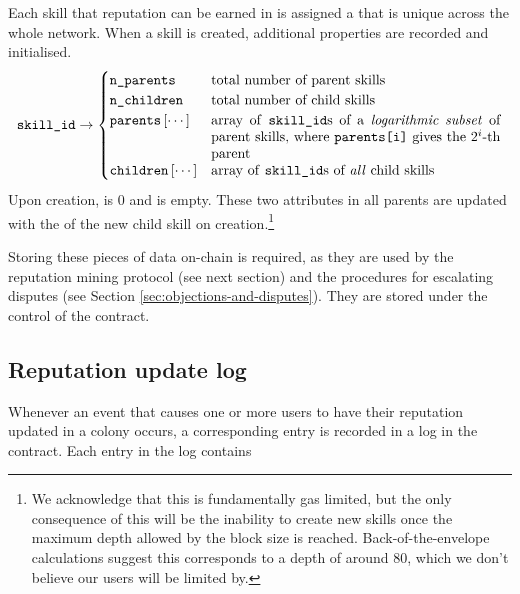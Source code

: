 Each skill that reputation can be earned in is assigned a  that is unique across the whole network. When a skill is created, additional properties are recorded and initialised.
\begin{equation*}
  \ascode{skill\_id} \rightarrow
  \begin{cases}
    \ascode{n\_parents} &	\textnormal{total number of parent skills}\\
    \ascode{n\_children} &	\textnormal{total number of child skills}\\
    \ascode{parents}\left[\cdots\right] &	\parbox[t]{.6\linewidth}{\textnormal{array of \ascode{skill\_id}s of a \textit{logarithmic subset} of parent skills, where \ascode{parents[i]} gives the $2^i$-th parent}}\\
    \ascode{children}\left[\cdots\right] &	\textnormal{array of \ascode{skill\_id}s of \textit{all} child skills}
  \end{cases}
\end{equation*}
Upon creation,  is 0 and  is empty\watermark. These two attributes in all parents are updated with the  of the new child skill on creation.\footnote{We acknowledge that this is fundamentally gas limited, but the only consequence of this will be the inability to create new skills once the maximum depth allowed by the block size is reached. Back-of-the-envelope calculations suggest this corresponds to a depth of around 80, which we don't believe our users will be limited by.}

Storing these pieces of data on-chain is required, as they are used by the reputation mining protocol (see next section) and the procedures for escalating disputes (see Section \ref{sec:objections-and-disputes}). They are stored under the control of the  contract.

\subsection{Reputation update log}\label{subsec:reputation-update-log}

Whenever an event that causes one or more users to have their reputation updated in a colony occurs, a corresponding entry is recorded in a log in the  contract. Each entry in the log contains

